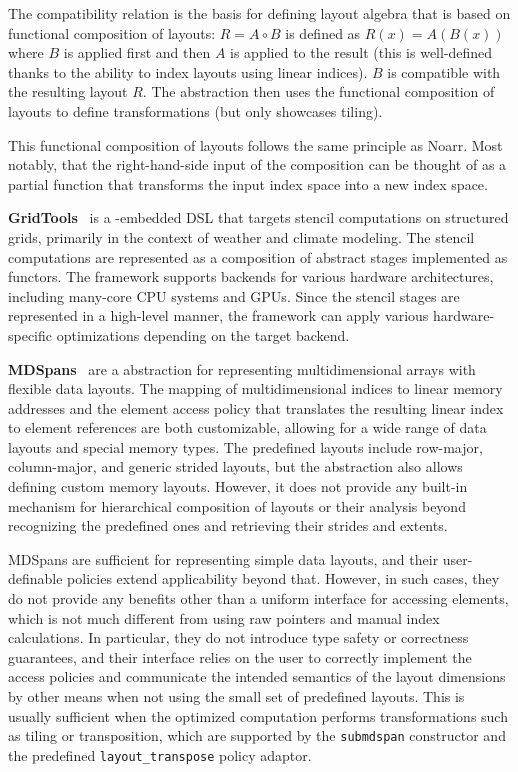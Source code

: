 The compatibility relation is the basis for defining layout algebra that is based on functional composition of layouts: $R = A \circ B$ is defined as $R(x) = A(B(x))$ where $B$ is applied first and then $A$ is applied to the result (this is well-defined thanks to the ability to index layouts using linear indices). $B$ is compatible with the resulting layout $R$. The abstraction then uses the functional composition of layouts to define transformations (but only showcases tiling).

This functional composition of layouts follows the same principle as Noarr. Most notably, that the right-hand-side input of the composition can be thought of as a partial function that transforms the input index space into a new index space.

\textbf{GridTools}~\cite{afanasyev2021gridtools} is a \cpp-embedded DSL that targets stencil computations on structured grids, primarily in the context of weather and climate modeling. The stencil computations are represented as a composition of abstract stages implemented as \cpp functors. The framework supports backends for various hardware architectures, including many-core CPU systems and GPUs\@. Since the stencil stages are represented in a high-level manner, the framework can apply various hardware-specific optimizations depending on the target backend.

\textbf{MDSpans}~\cite{trott2022mdspan} are a \cpp abstraction for representing multidimensional arrays with flexible data layouts. The mapping of multidimensional indices to linear memory addresses and the element access policy that translates the resulting linear index to element references are both customizable, allowing for a wide range of data layouts and special memory types. The predefined layouts include row-major, column-major, and generic strided layouts, but the abstraction also allows defining custom memory layouts. However, it does not provide any built-in mechanism for hierarchical composition of layouts or their analysis beyond recognizing the predefined ones and retrieving their strides and extents.

MDSpans are sufficient for representing simple data layouts, and their user-definable policies extend applicability beyond that. However, in such cases, they do not provide any benefits other than a uniform interface for accessing elements, which is not much different from using raw pointers and manual index calculations. In particular, they do not introduce type safety or correctness guarantees, and their interface relies on the user to correctly implement the access policies and communicate the intended semantics of the layout dimensions by other means when not using the small set of predefined layouts. This is usually sufficient when the optimized computation performs transformations such as tiling or transposition, which are supported by the \lstinline{submdspan} constructor and the predefined \lstinline{layout_transpose} policy adaptor.

